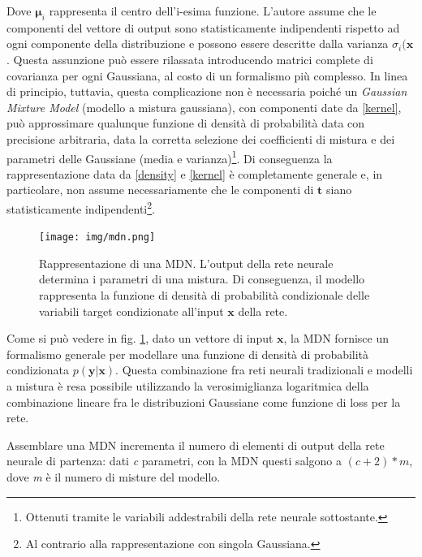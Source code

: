 Dove $\boldsymbol{\mu}_i$ rappresenta il centro dell'i-esima funzione. L'autore assume che le componenti del vettore di output sono statisticamente indipendenti rispetto ad ogni componente della distribuzione e possono essere descritte dalla varianza $\sigma_i(\boldsymbol{x}$. Questa assunzione può essere rilassata introducendo matrici complete di covarianza per ogni Gaussiana, al costo di un formalismo più complesso. In linea di principio, tuttavia, questa complicazione non è necessaria poiché un \textit{Gaussian Mixture Model} (modello a mistura gaussiana), con componenti date da \ref{kernel}, può approssimare qualunque funzione di densità di probabilità data con precisione arbitraria, data la corretta selezione dei coefficienti di mistura e dei parametri delle Gaussiane (media e varianza)\footnote{Ottenuti tramite le variabili addestrabili della rete neurale sottostante.}. Di conseguenza la rappresentazione data da \ref{density} e \ref{kernel} è completamente generale e, in particolare, non assume necessariamente che le componenti di $\boldsymbol{t}$ siano statisticamente indipendenti\footnote{Al contrario alla rappresentazione con singola Gaussiana.}.
\begin{figure}[ht]
	\centering
	\texttt{[image: img/mdn.png]}
	\caption{Rappresentazione di una MDN. L'output della rete neurale determina i parametri di una mistura. Di conseguenza, il modello rappresenta la funzione di densità di probabilità condizionale delle variabili target condizionate all'input $\boldsymbol{x}$ della rete.}
	\label{fig:1.22}
\end{figure}

Come si può vedere in fig. \ref{fig:1.22}, dato un vettore di input $\boldsymbol{x}$, la MDN fornisce un formalismo generale per modellare una funzione di densità di probabilità condizionata $p(\boldsymbol{y} | \boldsymbol{x})$. Questa combinazione fra reti neurali tradizionali e modelli a mistura è resa possibile utilizzando la verosimiglianza logaritmica della combinazione lineare fra le distribuzioni Gaussiane come funzione di loss per la rete.

Assemblare una MDN incrementa il numero di elementi di output della rete neurale di partenza: dati \textit{c} parametri, con la MDN questi salgono a $(c + 2) * m$, dove \textit{m} è il numero di misture del modello.

